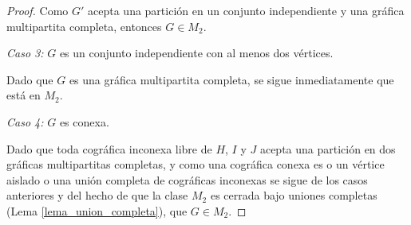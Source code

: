\begin{proof}
  Como $G'$ acepta una partición en un conjunto independiente y una gráfica
  multipartita completa, entonces $G \in M_2$.


  \emph{Caso 3:} $G$ es un conjunto independiente con al menos dos vértices.

  Dado que $G$ es una gráfica multipartita completa, se sigue inmediatamente
  que está en $M_2$.

  \emph{Caso 4:} $G$ es conexa.

  Dado que toda cográfica inconexa libre de $H$, $I$ y $J$ acepta una
  partición en dos gráficas multipartitas completas, y como una cográfica
  conexa es o un vértice aislado o una unión completa de cográficas
  inconexas se sigue de los casos anteriores y del hecho de que la clase
  $M_2$ es cerrada bajo uniones completas (Lema
  \ref{lema_union_completa}), que $G \in M_2$.

\end{proof}
